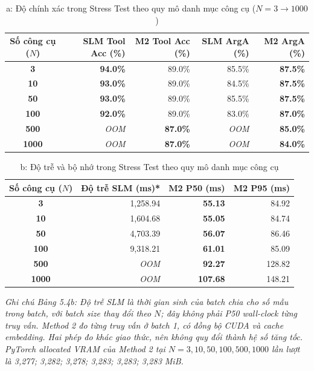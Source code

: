 \begin{table}[htbp]
    \centering
    \caption{a: Độ chính xác trong Stress Test theo quy mô danh mục công cụ ($N = 3 \to 1000$)}
    \label{tab:bảng_5_4}
    \begin{tabular}{crrrr}
        \toprule
        \textbf{Số công cụ ($N$)} & \textbf{SLM Tool Acc (\%)} & \textbf{M2 Tool Acc (\%)} & \textbf{SLM ArgA (\%)} & \textbf{M2 ArgA (\%)} \\
        \midrule
        \textbf{3} & \textbf{94.0\%} & 89.0\% & 85.5\% & \textbf{87.5\%} \\
        \textbf{10} & \textbf{93.0\%} & 89.0\% & 84.5\% & \textbf{87.5\%} \\
        \textbf{50} & \textbf{93.0\%} & 89.0\% & 85.5\% & \textbf{87.5\%} \\
        \textbf{100} & \textbf{92.0\%} & 89.0\% & 83.0\% & \textbf{87.0\%} \\
        \textbf{500} & \textit{OOM} & \textbf{87.0\%} & \textit{OOM} & \textbf{85.0\%} \\
        \textbf{1000} & \textit{OOM} & \textbf{87.0\%} & \textit{OOM} & \textbf{84.0\%} \\
        \bottomrule
    \end{tabular}
\end{table}


\begin{table}[htbp]
    \centering
    \caption{b: Độ trễ và bộ nhớ trong Stress Test theo quy mô danh mục công cụ}
    \label{tab:bảng_5_4}
    \begin{tabular}{crrr}
        \toprule
        \textbf{Số công cụ ($N$)} & \textbf{Độ trễ SLM (ms)*} & \textbf{M2 P50 (ms)} & \textbf{M2 P95 (ms)} \\
        \midrule
        \textbf{3} & 1,258.94 & \textbf{55.13} & 84.92 \\
        \textbf{10} & 1,604.68 & \textbf{55.05} & 84.74 \\
        \textbf{50} & 4,703.39 & \textbf{56.07} & 86.46 \\
        \textbf{100} & 9,318.21 & \textbf{61.01} & 85.09 \\
        \textbf{500} & \textit{OOM} & \textbf{92.27} & 128.82 \\
        \textbf{1000} & \textit{OOM} & \textbf{107.68} & 148.21 \\
        \bottomrule
    \end{tabular}
\end{table}

\textit{Ghi chú Bảng 5.4b: Độ trễ SLM là thời gian sinh của batch chia cho số mẫu trong batch, với batch size thay đổi theo $N$; đây không phải P50 wall-clock từng truy vấn. Method 2 đo từng truy vấn ở batch 1, có đồng bộ CUDA và cache embedding. Hai phép đo khác giao thức, nên không quy đổi thành hệ số tăng tốc. PyTorch allocated VRAM của Method 2 tại $N=3, 10, 50, 100, 500, 1000$ lần lượt là 3,277; 3,282; 3,278; 3,283; 3,283; 3,283 MiB.}

